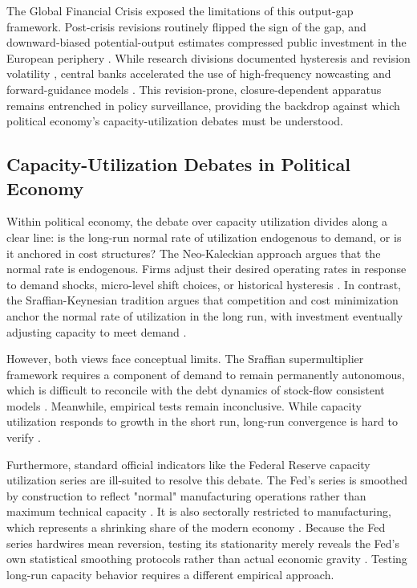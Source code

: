 \documentclass[11pt]{article}
\begin{document}
The Global Financial Crisis exposed the limitations of this output-gap framework. Post-crisis revisions routinely flipped the sign of the gap, and downward-biased potential-output estimates compressed public investment in the European periphery \citep{Heimberger2017, Heimberger2020}. While research divisions documented hysteresis and revision volatility \citep{CerraSaxena2017, CerraFatasSaxena2023, BarkemaGudmundssonMrkaic2020}, central banks accelerated the use of high-frequency nowcasting and forward-guidance models \citep{AastveitTrovik2014, Berger2023, Foster2024}. This revision-prone, closure-dependent apparatus remains entrenched in policy surveillance, providing the backdrop against which political economy's capacity-utilization debates must be understood.

\subsection{Capacity-Utilization Debates in Political Economy}
\label{subsec:pe_utilization_debates}

Within political economy, the debate over capacity utilization divides along a clear line: is the long-run normal rate of utilization endogenous to demand, or is it anchored in cost structures? The Neo-Kaleckian approach argues that the normal rate is endogenous. Firms adjust their desired operating rates in response to demand shocks, micro-level shift choices, or historical hysteresis \citep{Lavoie1995, Nikiforos2013, Setterfield2020}. In contrast, the Sraffian-Keynesian tradition argues that competition and cost minimization anchor the normal rate of utilization in the long run, with investment eventually adjusting capacity to meet demand \citep{Ciccone1986}.

However, both views face conceptual limits. The Sraffian supermultiplier framework requires a component of demand to remain permanently autonomous, which is difficult to reconcile with the debt dynamics of stock-flow consistent models \citep{Nikiforos2018}. Meanwhile, empirical tests remain inconclusive. While capacity utilization responds to growth in the short run, long-run convergence is hard to verify \citep{GahnGonzalez2022}.

Furthermore, standard official indicators like the Federal Reserve capacity utilization series are ill-suited to resolve this debate. The Fed's series is smoothed by construction to reflect "normal" manufacturing operations rather than maximum technical capacity \citep{Shapiro1989}. It is also sectorally restricted to manufacturing, which represents a shrinking share of the modern economy \citep{Haluska2023}. Because the Fed series hardwires mean reversion, testing its stationarity merely reveals the Fed's own statistical smoothing protocols rather than actual economic gravity \citep{Nikiforos2016, Nikiforos2021}. Testing long-run capacity behavior requires a different empirical approach.
\end{document}
